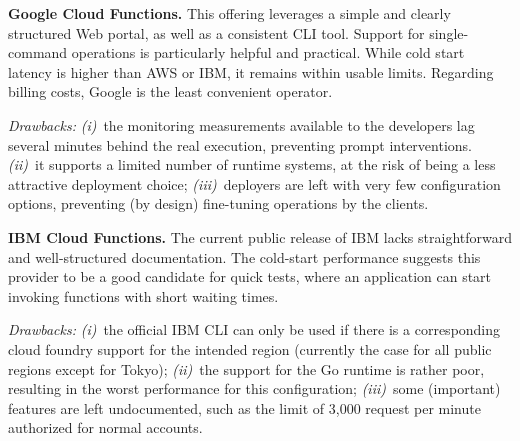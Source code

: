 \textbf{Google Cloud Functions.}
This offering leverages a simple and clearly structured Web portal, as well as a consistent \gls{CLI} tool. 
Support for single-command operations is particularly helpful and practical. 
While cold start latency is higher than AWS or IBM, it remains within usable limits. 
Regarding billing costs, Google is the least convenient operator.

\emph{Drawbacks:}
\emph{(i)}~the monitoring measurements available to the developers lag several minutes behind the real execution, preventing prompt interventions.
\emph{(ii)}~it supports a limited number of runtime systems, at the risk of being a less attractive deployment choice;
\emph{(iii)}~deployers are left with very few configuration options, preventing (by design) fine-tuning operations by the clients.

\textbf{IBM Cloud Functions.}
The current public release of IBM lacks straightforward and well-structured documentation.
The cold-start performance suggests this provider to be a good candidate for quick tests, where an application can start invoking functions with short waiting times.

\emph{Drawbacks:}
\emph{(i)}~the official IBM \gls{CLI} can only be used if there is a corresponding cloud foundry support for the intended region (currently the case for all public regions except for Tokyo);
\emph{(ii)}~the support for the Go runtime is rather poor, resulting in the worst performance for this configuration;
\emph{(iii)}~some (important) features are left undocumented, such as the limit of 3,000 request per minute authorized for normal accounts.
 
